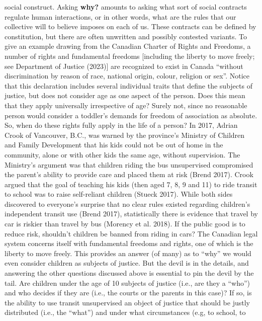 \documentclass[12pt, oneside]{report}
\begin{document}
\begin{itemize}
  social construct. Asking \textbf{why?} amounts to asking what sort of
  social contracts regulate human interactions, or in other words, what
  are the rules that our collective will to believe imposes on each of
  us. These contracts can be defined by constitution, but there are
  often unwritten and possibly contested variants. To give an example
  drawing from the Canadian Charter of Rights and Freedoms, a number of
  rights and fundamental freedoms {[}including the liberty to move
  freely; see Department of Justice (2023){]} are recognized to exist in
  Canada ``without discrimination by reason of race, national origin,
  colour, religion or sex''. Notice that this declaration includes
  several individual traits that define the subjects of justice, but
  does not consider age as one aspect of the person. Does this mean that
  they apply universally irrespective of age? Surely not, since no
  reasonable person would consider a toddler's demands for freedom of
  association as absolute. So, when do these rights fully apply in the
  life of a person? In 2017, Adrian Crook of Vancouver, B.C., was warned
  by the province's Ministry of Children and Family Development that his
  kids could not be out of home in the community, alone or with other
  kids the same age, without supervision. The Ministry's argument was
  that children riding the bus unsupervised compromised the parent's
  ability to provide care and placed them at risk (Brend 2017). Crook
  argued that the goal of teaching his kids (then aged 7, 8, 9 and 11)
  to ride transit to school was to raise self-reliant children (Stueck
  2017). While both sides discovered to everyone's surprise that no
  clear rules existed regarding children's independent transit use
  (Brend 2017), statistically there is evidence that travel by car is
  riskier than travel by bus (Morency et al. 2018). If the public good
  is to reduce risk, shouldn't children be banned from riding in cars?
  The Canadian legal system concerns itself with fundamental freedoms
  and rights, one of which is the liberty to move freely. This provides
  an answer (of many) as to ``why'' we would even consider children as
  subjects of justice. But the devil is in the details, and answering
  the other questions discussed above is essential to pin the devil by
  the tail. Are children under the age of 10 subjects of justice (i.e.,
  are they a ``who'') and who decides if they are (i.e., the courts or
  the parents in this case)? If so, is the ability to use transit
  unsupervised an object of justice that should be justly distributed
  (i.e., the ``what'') and under what circumstances (e.g, to school, to

\end{itemize}
\end{document}

